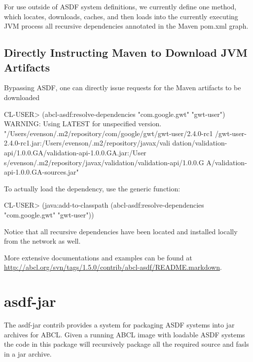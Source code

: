 \documentclass[10pt]{book}
\begin{document}
For use outside of ASDF system definitions, we currently define one
method,  which locates,
downloads, caches, and then loads into the currently executing JVM
process all recursive dependencies annotated in the Maven pom.xml
graph.

\subsection{Directly Instructing Maven to Download JVM Artifacts}

Bypassing \textsc{ASDF}, one can directly issue requests for the Maven
artifacts to be downloaded

\begin{listing-lisp}
CL-USER> (abcl-asdf:resolve-dependencies "com.google.gwt"
                                         "gwt-user")
WARNING: Using LATEST for unspecified version.
"/Users/evenson/.m2/repository/com/google/gwt/gwt-user/2.4.0-rc1
/gwt-user-2.4.0-rc1.jar:/Users/evenson/.m2/repository/javax/vali
dation/validation-api/1.0.0.GA/validation-api-1.0.0.GA.jar:/User
s/evenson/.m2/repository/javax/validation/validation-api/1.0.0.G
A/validation-api-1.0.0.GA-sources.jar"
\end{listing-lisp}

To actually load the dependency, use the  generic
function:

\begin{listing-lisp}
CL-USER> (java:add-to-classpath
          (abcl-asdf:resolve-dependencies "com.google.gwt"
                                          "gwt-user"))
\end{listing-lisp}

Notice that all recursive dependencies have been located and installed
locally from the network as well.

More extensive documentations and examples can be found at
\url{http://abcl.org/svn/tags/1.5.0/contrib/abcl-asdf/README.markdown}.

\section{asdf-jar}

The asdf-jar contrib provides a system for packaging \textsc{ASDF}
systems into jar archives for \textsc{ABCL}.  Given a running
\textsc{ABCL} image with loadable \textsc{ASDF} systems the code in
this package will recursively package all the required source and
fasls in a jar archive.
\end{document}
